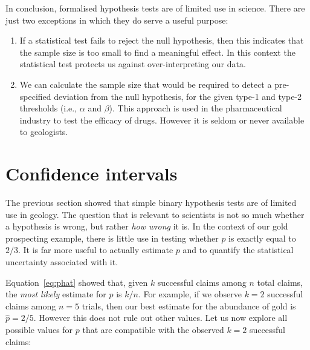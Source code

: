 In conclusion, formalised hypothesis tests are of limited use in
science.  There are just two exceptions in which they do serve a
useful purpose:

\begin{enumerate}
\item If a statistical test fails to reject the null hypothesis, then
  this indicates that the sample size is too small to find a
  meaningful effect. In this context the statistical test protects us
  against over-interpreting our data.
\item We can calculate the sample size that would be required to
  detect a pre-specified deviation from the null hypothesis, for the
  given type-1 and type-2 thresholds (i.e., $\alpha$ and $\beta$).
  This approach is used in the pharmaceutical industry to test the
  efficacy of drugs. However it is seldom or never available to
  geologists.
\end{enumerate}

\section{Confidence intervals}
\label{sec:binomCI}

The previous section showed that simple binary hypothesis tests are of
limited use in geology. The question that is relevant to scientists is
not so much whether a hypothesis is wrong, but rather \emph{how wrong}
it is. In the context of our gold prospecting example, there is little
use in testing whether $p$ is exactly equal to $2/3$. It is far more
useful to actually estimate $p$ and to quantify the statistical
uncertainty associated with it.\medskip

Equation~\ref{eq:phat} showed that, given $k$ successful claims among
$n$ total claims, the \emph{most likely} estimate for $p$ is $k/n$.
For example, if we observe $k=2$ successful claims among $n=5$ trials,
then our best estimate for the abundance of gold is $\hat{p}=2/5$.
However this does not rule out other values. Let us now explore all
possible values for $p$ that are compatible with the observed $k=2$
successful claims:

